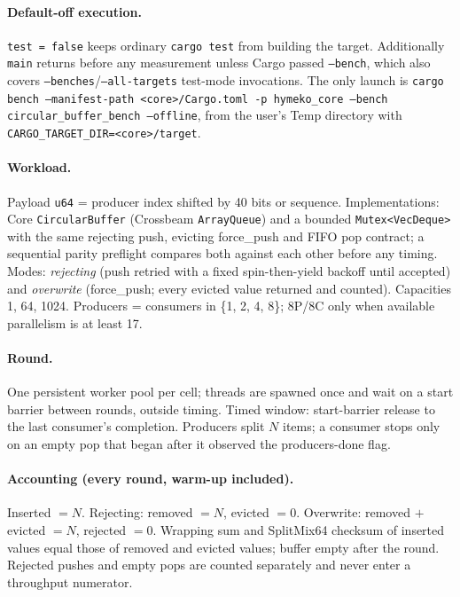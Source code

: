 \documentclass{article}
\begin{document}
\paragraph{Default-off execution.} \texttt{test = false} keeps ordinary
\texttt{cargo test} from building the target. Additionally \texttt{main} returns
before any measurement unless Cargo passed \texttt{--bench}, which also covers
\texttt{--benches}/\texttt{--all-targets} test-mode invocations. The only launch is
\texttt{cargo bench --manifest-path <core>/Cargo.toml -p hymeko\_core --bench
circular\_buffer\_bench --offline}, from the user's Temp directory with
\texttt{CARGO\_TARGET\_DIR=<core>/target}.

\paragraph{Workload.} Payload \texttt{u64} = producer index shifted by 40 bits or
sequence. Implementations: Core \texttt{CircularBuffer} (Crossbeam
\texttt{ArrayQueue}) and a bounded \texttt{Mutex<VecDeque>} with the same
rejecting push, evicting force\_push and FIFO pop contract; a sequential parity
preflight compares both against each other before any timing. Modes:
\emph{rejecting} (push retried with a fixed spin-then-yield backoff until accepted)
and \emph{overwrite} (force\_push; every evicted value returned and counted).
Capacities 1, 64, 1024. Producers = consumers in \{1, 2, 4, 8\}; 8P/8C only when
available parallelism is at least 17.

\paragraph{Round.} One persistent worker pool per cell; threads are spawned once and
wait on a start barrier between rounds, outside timing. Timed window: start-barrier
release to the last consumer's completion. Producers split $N$ items; a consumer
stops only on an empty pop that began after it observed the producers-done flag.

\paragraph{Accounting (every round, warm-up included).} Inserted $= N$. Rejecting:
removed $= N$, evicted $= 0$. Overwrite: removed $+$ evicted $= N$, rejected $= 0$.
Wrapping sum and SplitMix64 checksum of inserted values equal those of removed and
evicted values; buffer empty after the round. Rejected pushes and empty pops are
counted separately and never enter a throughput numerator.
\end{document}
